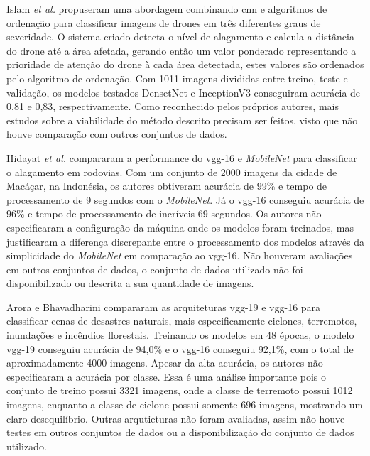 Islam \textit{et al.}\cite{ISLAM2023100225} propuseram uma abordagem combinando \acrshort{cnn} e algoritmos de ordenação para classificar imagens de drones em três diferentes graus de severidade. 
O sistema criado detecta o nível de alagamento e calcula a distância do drone até a área afetada, 
gerando então um valor ponderado representando a prioridade de atenção do drone à cada área detectada, estes valores são ordenados pelo algoritmo de ordenação. 
Com 1011 imagens divididas entre treino, teste e validação, os modelos testados DensetNet e InceptionV3 conseguiram acurácia de 0,81 e 0,83, respectivamente.
Como reconhecido pelos próprios autores, mais estudos sobre a viabilidade do método descrito precisam ser feitos, visto que não houve comparação com outros conjuntos de dados.

Hidayat \textit{et al.}\cite{hidayat2024} compararam a performance do \acrshort{vgg}-16 e \textit{MobileNet} para classificar o alagamento em rodovias.
Com um conjunto de 2000 imagens da cidade de Macáçar, na Indonésia, os autores obtiveram acurácia de 99\% e tempo de processamento de 9 segundos com o \textit{MobileNet}. Já o 
\acrshort{vgg}-16 conseguiu acurácia de 96\% e tempo de processamento de incríveis 69 segundos.
Os autores não especificaram a configuração da máquina onde os modelos foram treinados, mas justificaram a diferença discrepante entre o processamento dos modelos através da simplicidade
do \textit{MobileNet} em comparação ao \acrshort{vgg}-16.
Não houveram avaliações em outros conjuntos de dados, o conjunto de dados utilizado não foi disponibilizado ou descrita a sua quantidade de imagens.

Arora e Bhavadharini \cite{arora2024} compararam as arquiteturas \acrshort{vgg}-19 e \acrshort{vgg}-16 para classificar cenas de desastres naturais, mais especificamente ciclones, terremotos, inundações e incêndios florestais.
Treinando os modelos em 48 épocas, o modelo \acrshort{vgg}-19 conseguiu acurácia de 94,0\% e o \acrshort{vgg}-16 conseguiu 92,1\%, com o total de aproximadamente 4000 imagens.
Apesar da alta acurácia, os autores não especificaram a acurácia por classe. Essa é uma análise importante pois o conjunto de treino possui 3321 imagens, onde a classe de terremoto possui 1012 imagens,
enquanto a classe de ciclone possui somente 696 imagens, mostrando um claro desequilíbrio.
Outras arqutieturas não foram avaliadas, assim não houve testes em outros conjuntos de dados ou a disponibilização do conjunto de dados utilizado.

